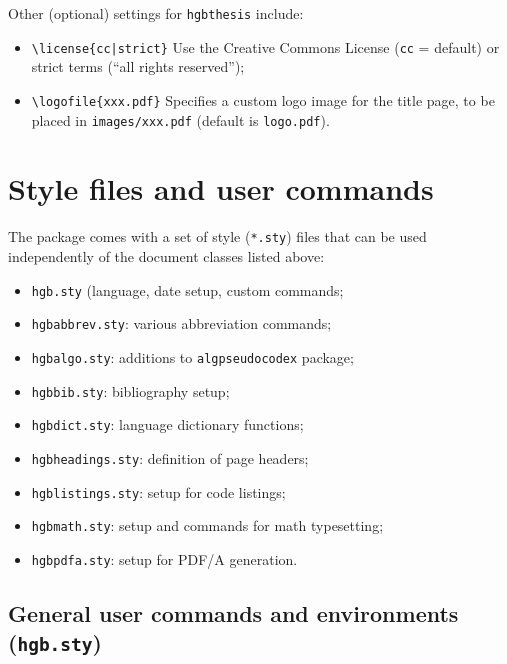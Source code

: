 \documentclass[english]{hgbarticle}
\begin{document}
\noindent
Other (optional) settings for \texttt{hgbthesis} include:
\begin{itemize}
    \item \verb!\license{cc|strict}!\newline
    Use the Creative Commons License (\texttt{cc} = default) or strict terms
      (``all rights reserved'');
    \item \verb!\logofile{xxx.pdf}!\newline
    Specifies a custom logo image for the title page, to be placed in \verb!images/xxx.pdf!
    (default is \texttt{logo.pdf}).
\end{itemize}

\section{Style files and user commands}

The package comes with a set of style (\texttt{*.sty}) files that can be used
independently of the document classes listed above:
\begin{itemize}
  \item \texttt{hgb.sty} (language, date setup, custom commands;
  \item \texttt{hgbabbrev.sty}: various abbreviation commands;
  \item \texttt{hgbalgo.sty}: additions to \texttt{algpseudocodex} package;
  \item \texttt{hgbbib.sty}: bibliography setup;
  \item \texttt{hgbdict.sty}: language dictionary functions;
  \item \texttt{hgbheadings.sty}: definition of page headers;
  \item \texttt{hgblistings.sty}: setup for code listings;
  \item \texttt{hgbmath.sty}: setup and commands for math typesetting;
  \item \texttt{hgbpdfa.sty}: setup for PDF/A generation.
\end{itemize}

\subsection{General user commands and environments (\texttt{hgb.sty})}
\label{sec:GeneralUserCommands}
\end{document}
